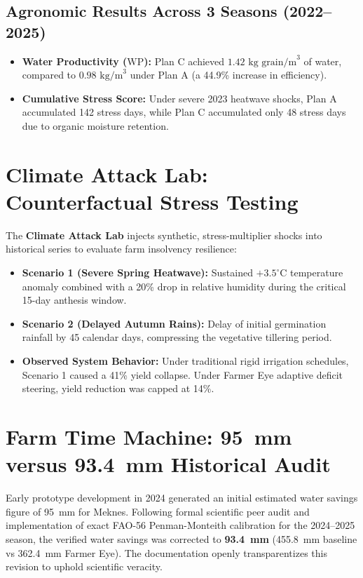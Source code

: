 \documentclass[11pt,a4paper,oneside]{report}
\begin{document}
\subsection{Agronomic Results Across 3 Seasons (2022–2025)}
\begin{itemize}[leftmargin=*]
    \item \textbf{Water Productivity ($\text{WP}$):} Plan C achieved $1.42\text{ kg grain/m}^3$ of water, compared to $0.98\text{ kg/m}^3$ under Plan A (a 44.9\% increase in efficiency).
    \item \textbf{Cumulative Stress Score:} Under severe 2023 heatwave shocks, Plan A accumulated 142 stress days, while Plan C accumulated only 48 stress days due to organic moisture retention.
\end{itemize}

\section{Climate Attack Lab: Counterfactual Stress Testing}
The \textbf{Climate Attack Lab} injects synthetic, stress-multiplier shocks into historical series to evaluate farm insolvency resilience:
\begin{itemize}[leftmargin=*]
    \item \textbf{Scenario 1 (Severe Spring Heatwave):} Sustained $+3.5^\circ\text{C}$ temperature anomaly combined with a 20\% drop in relative humidity during the critical 15-day anthesis window.
    \item \textbf{Scenario 2 (Delayed Autumn Rains):} Delay of initial germination rainfall by 45 calendar days, compressing the vegetative tillering period.
    \item \textbf{Observed System Behavior:} Under traditional rigid irrigation schedules, Scenario 1 caused a 41\% yield collapse. Under Farmer Eye adaptive deficit steering, yield reduction was capped at 14\%.
\end{itemize}

\section{Farm Time Machine: 95~mm versus 93.4~mm Historical Audit}
Early prototype development in 2024 generated an initial estimated water savings figure of 95~mm for Meknes. Following formal scientific peer audit and implementation of exact FAO-56 Penman-Monteith calibration for the 2024–2025 season, the verified water savings was corrected to \textbf{93.4~mm} (455.8~mm baseline vs 362.4~mm Farmer Eye). The documentation openly transparentizes this revision to uphold scientific veracity.
\end{document}
